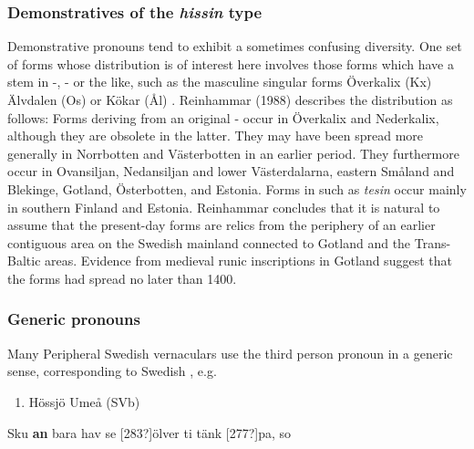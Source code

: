 \subsubsection[Demonstratives of the hissin type]{Demonstratives of the \textit{hissin} type}
Demonstrative pronouns tend to exhibit a sometimes confusing diversity. One set of forms whose distribution is of interest here involves those forms which have a stem in -, - or the like, such as the masculine singular forms Överkalix (Kx) Älvdalen (Os) or Kökar (Ål) . Reinhammar (1988) describes the distribution as follows: Forms deriving from an original - occur in Överkalix and Nederkalix, although they are obsolete in the latter. They may have been spread more  generally in Norrbotten and Västerbotten in an earlier period. They furthermore occur in Ovansiljan, Nedansiljan and lower Västerdalarna, eastern Småland and Blekinge, Gotland, Österbotten, and Estonia. Forms in  such as \textit{tesin} occur mainly in southern Finland and Estonia. Reinhammar concludes that it is natural to assume that the present-day forms are relics from the periphery of an earlier contiguous area on the Swedish mainland connected to Gotland and the Trans-Baltic areas. Evidence from medieval runic inscriptions in Gotland suggest that the forms had spread no later than 1400.

\subsubsection[Generic pronouns]{\rmfamily Generic pronouns}
Many Peripheral Swedish vernaculars use the third person pronoun  in a generic sense, corresponding to Swedish , e.g.

\begin{enumerate} %
\item 
Hössjö Umeå (SVb)

\end{enumerate} %
\ea\label{}
\gll Sku  \textbf{an} bara  hav  se  [283?]ölver  ti  tänk  [277?]pa,  so\\


